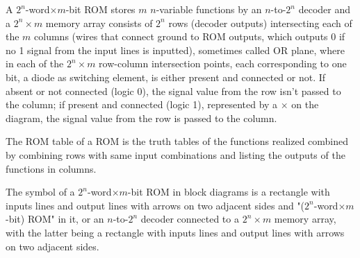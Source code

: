 \documentclass[a4paper,12pt]{article}
\begin{document}
\begin{itemize}
\begin{itemize}
\begin{itemize}
\begin{itemize}
\begin{itemize}
\begin{itemize}
\begin{itemize}
A $2^n$-word$\times m$-bit ROM stores $m$ $n$-variable functions by an $n$-to-$2^n$ decoder and a $2^n\times m$ memory array consists of $2^n$ rows (decoder outputs) intersecting each of the $m$ columns (wires that connect ground to ROM outputs, which outputs 0 if no 1 signal from the input lines is inputted), sometimes called OR plane, where in each of the $2^n\times m$ row-column intersection points, each corresponding to one bit, a diode as switching element, is either present and connected or not. If absent or not connected (logic 0), the signal value from the row isn't passed to the column; if present and connected (logic 1), represented by a $\times$ on the diagram, the signal value from the row is passed to the column.

The ROM table of a ROM is the truth tables of the functions realized combined by combining rows with same input combinations and listing the outputs of the functions in columns.

The symbol of a $2^n$-word$\times m$-bit ROM in block diagrams is a rectangle with inputs lines and output lines with arrows on two adjacent sides and "($2^n$-word$\times m$-bit) ROM" in it, or an $n$-to-$2^n$ decoder connected to a $2^n\times m$ memory array, with the latter being a rectangle with inputs lines and output lines with arrows on two adjacent sides.


\end{itemize}
\end{itemize}
\end{itemize}
\end{itemize}
\end{itemize}
\end{itemize}
\end{itemize}
\end{document}
